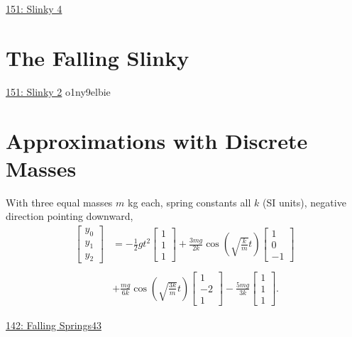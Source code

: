 \documentclass{ximera}
\begin{document}
\href{https://www.desmos.com/calculator/o1ny9elbie}{151: Slinky 4}


\section{The Falling Slinky}

\begin{onlineOnly}
    \begin{center}
\end{center}
\end{onlineOnly}

\href{https://www.desmos.com/calculator/fahf3t461i}{151: Slinky 2}
o1ny9elbie


\section{Approximations with Discrete Masses}

With three equal masses $m$ kg each, spring constants all $k$ (SI units), negative direction pointing downward,
\begin{align*}
 \begin{bmatrix}
y_0\\
y_1 \\
y_2
\end{bmatrix} 
&=
-\frac{1}{2}gt^2 
 \begin{bmatrix}
1\\
1 \\
1
\end{bmatrix} 
+
\frac{3mg}{2k} \cos\left( \sqrt{\frac{k}{m}} t  \right)
 \begin{bmatrix}
1\\
0 \\
-1
\end{bmatrix}   \\ \\
& +  
\frac{mg}{6k} \cos\left( \sqrt{\frac{3k}{m}} t  \right)
 \begin{bmatrix}
1\\
-2 \\
1
\end{bmatrix}
-  
\frac{5mg}{3k}
 \begin{bmatrix}
1\\
1 \\
1
\end{bmatrix}.
\end{align*}

\begin{onlineOnly}
    \begin{center}
\end{center}
\end{onlineOnly}

\href{https://www.desmos.com/calculator/tnhnhzfnbu}{142: Falling Springs43}
\end{document}
